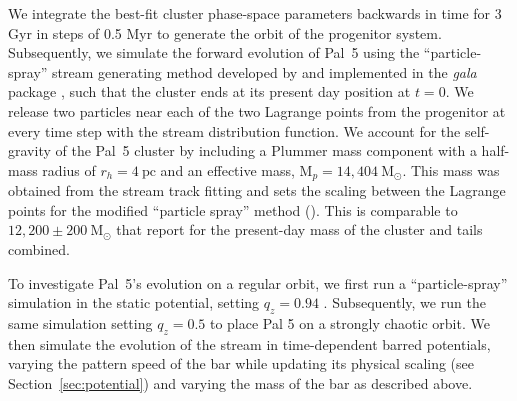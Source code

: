 \documentclass[twocolumn]{aastex62}
\newcommand{\package}[1]{\textsl{#1}}
\newcommand{\msun}{\textrm{M}_\odot}
\newcommand{\ab}[1]{{\color{teal} AB: #1}}
\newcommand{\sa}[1]{{\color{magenta} SP: #1}}
\begin{document}
We integrate the best-fit cluster phase-space parameters backwards in time for 3 Gyr in steps of 0.5 Myr to generate the orbit of the progenitor system. %
Subsequently, we simulate the forward evolution of Pal~5 using the ``particle-spray'' stream generating method developed by \citet{Fardal:2015} and implemented in the \package{gala} package \citep{gala}, such that the cluster ends at its present day position at $t = 0$.
We release two particles near each of the two Lagrange points from the progenitor at every time step with the \citet{Fardal:2015} stream distribution function. %
We account for the self-gravity of the Pal~5 cluster by including a Plummer mass component with a half-mass radius of $r_h = 4~\textrm{pc}$ and an effective mass, $\textrm{M}_p = 14,404~\msun$. This mass was obtained from the stream track fitting and sets the scaling between the Lagrange points for the modified ``particle spray'' method (\citealt{Fardal:2015}).
This is comparable to $12,200 \pm 200~\msun$ that \citet{Ibata:2017} report for the present-day mass of the cluster and tails combined.

To investigate Pal~5's evolution on a regular orbit, we first run a ``particle-spray'' simulation in the static potential, setting $q_z = 0.94$ \citep{Bovy:2016}.
Subsequently, we run the same simulation setting $q_z = 0.5$ to place Pal 5 on a strongly chaotic orbit.
We then simulate the evolution of the stream in time-dependent barred potentials, varying the pattern speed of the bar while updating its physical scaling (see Section~\ref{sec:potential}) and varying the mass of the bar as described above.
\end{document}
